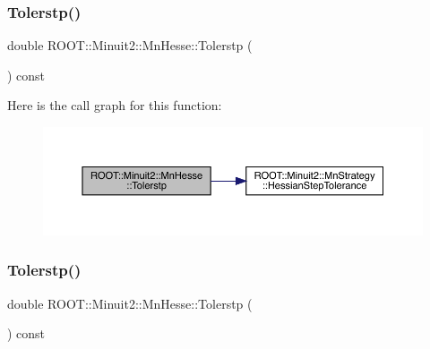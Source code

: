 \subsubsection{\texorpdfstring{Tolerstp()}{Tolerstp()}\hspace{0.1cm}{\footnotesize\ttfamily [2/3]}}
{\footnotesize\ttfamily double R\+O\+O\+T\+::\+Minuit2\+::\+Mn\+Hesse\+::\+Tolerstp (\begin{DoxyParamCaption}{ }\end{DoxyParamCaption}) const\hspace{0.3cm}{\ttfamily [inline]}}

Here is the call graph for this function\+:
\nopagebreak
\begin{figure}[H]
\begin{center}
\leavevmode
\includegraphics[width=350pt]{d1/d02/classROOT_1_1Minuit2_1_1MnHesse_a4b36474a0d157ecb634bbf5d120db669_cgraph}
\end{center}
\end{figure}
\mbox{\label{classROOT_1_1Minuit2_1_1MnHesse_a4b36474a0d157ecb634bbf5d120db669}} 
\subsubsection{\texorpdfstring{Tolerstp()}{Tolerstp()}\hspace{0.1cm}{\footnotesize\ttfamily [3/3]}}
{\footnotesize\ttfamily double R\+O\+O\+T\+::\+Minuit2\+::\+Mn\+Hesse\+::\+Tolerstp (\begin{DoxyParamCaption}{ }\end{DoxyParamCaption}) const\hspace{0.3cm}{\ttfamily [inline]}}

